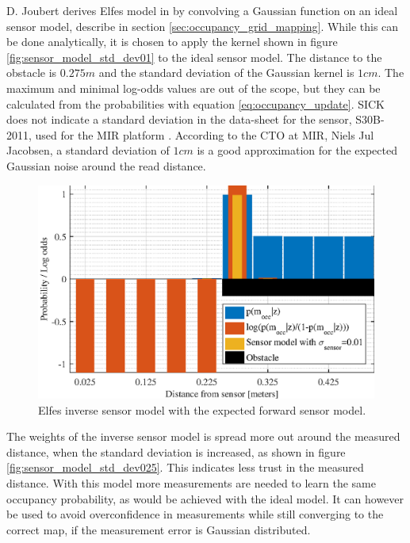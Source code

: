 D. Joubert derives Elfes model in \cite{Joubert2014} by convolving a Gaussian function on an ideal sensor model, describe in section \vref{sec:occupancy_grid_mapping}. While this can be done analytically, it is chosen to apply the kernel shown in figure \vref{fig:sensor_model_std_dev01} to the ideal sensor model.
The distance to the obstacle is $0.275m$ and the standard deviation of the Gaussian kernel is $1cm$. 
The maximum and minimal log-odds values are out of the scope, but they can be calculated from the probabilities with equation \vref{eq:occupancy_update}.
SICK does not indicate a standard deviation in the data-sheet for the sensor, S30B-2011, used for the MIR platform \cite{lidarDatasheet}.
According to the CTO at MIR, Niels Jul Jacobsen, a standard deviation of $1cm$ is a good approximation for the expected Gaussian noise around the read distance. 

\begin{figure}[htbp]
	\centering
	\includegraphics[scale=1.0]{figures/static_mapping/sensor_model_std_dev01}
	\caption{Elfes inverse sensor model with the expected forward sensor model.}
	\label{fig:sensor_model_std_dev01}
\end{figure}

The weights of the inverse sensor model is spread more out around the measured distance, when the standard deviation is increased, as shown in figure \vref{fig:sensor_model_std_dev025}. 
This indicates less trust in the measured distance. With this model more measurements are needed to learn the same occupancy probability, as would be achieved with the ideal model. It can however be used to avoid overconfidence in measurements while still converging to the correct map, if the measurement error is Gaussian distributed.

